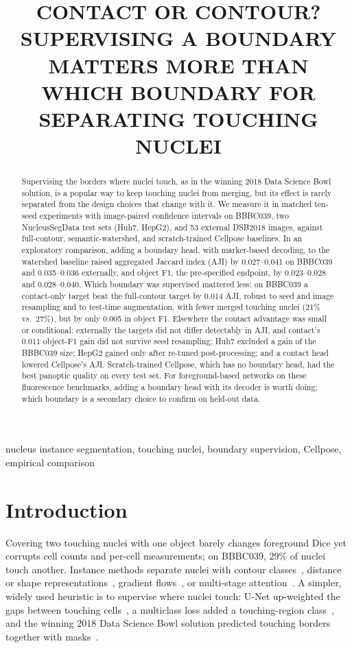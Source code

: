\documentclass{article}
\title{CONTACT OR CONTOUR? SUPERVISING A BOUNDARY MATTERS MORE THAN WHICH BOUNDARY FOR SEPARATING TOUCHING NUCLEI}
\begin{document}
\maketitle

\begin{abstract}
Supervising the borders where nuclei touch, as in the winning 2018 Data Science Bowl solution, is a popular way to keep touching nuclei from merging, but its effect is rarely separated from the design choices that change with it. We measure it in matched ten-seed experiments with image-paired confidence intervals on BBBC039, two NucleusSegData test sets (Huh7, HepG2), and 53 external DSB2018 images, against full-contour, semantic-watershed, and scratch-trained Cellpose baselines. In an exploratory comparison, adding a boundary head, with marker-based decoding, to the watershed baseline raised aggregated Jaccard index (AJI) by 0.027--0.041 on BBBC039 and 0.035--0.036 externally, and object F1, the pre-specified endpoint, by 0.023--0.028 and 0.028--0.040. Which boundary was supervised mattered less: on BBBC039 a contact-only target beat the full-contour target by 0.014 AJI, robust to seed and image resampling and to test-time augmentation, with fewer merged touching nuclei (21\% vs.\ 27\%), but by only 0.005 in object F1. Elsewhere the contact advantage was small or conditional: externally the targets did not differ detectably in AJI, and contact's 0.011 object-F1 gain did not survive seed resampling; Huh7 excluded a gain of the BBBC039 size; HepG2 gained only after re-tuned post-processing; and a contact head lowered Cellpose's AJI. Scratch-trained Cellpose, which has no boundary head, had the best panoptic quality on every test set. For foreground-based networks on these fluorescence benchmarks, adding a boundary head with its decoder is worth doing; which boundary is a secondary choice to confirm on held-out data.
\end{abstract}
\begin{keywords}
nucleus instance segmentation, touching nuclei, boundary supervision, Cellpose, empirical comparison
\end{keywords}

\section{Introduction}
Covering two touching nuclei with one object barely changes foreground Dice yet corrupts cell counts and per-cell measurements; on BBBC039, 29\% of nuclei touch another. Instance methods separate nuclei with contour classes~\cite{chen2016dcan,caicedo2019evaluation}, distance or shape representations~\cite{naylor2019segmentation,schmidt2018stardist,graham2019hovernet}, gradient flows~\cite{stringer2021cellpose}, or multi-stage attention~\cite{gunesli2020attentionboost}. A simpler, widely used heuristic is to supervise where nuclei touch: U-Net up-weighted the gaps between touching cells~\cite{ronneberger2015unet}, a multiclass loss added a touching-region class~\cite{guerreropena2018multiclass}, and the winning 2018 Data Science Bowl solution predicted touching borders together with masks~\cite{topcoders2018dsb,caicedo2019nucleus}.
\end{document}
